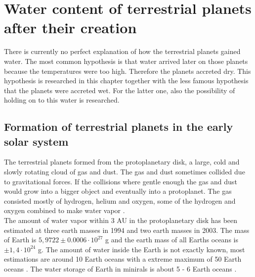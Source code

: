\section{\label{chap:creation}Water content of terrestrial planets after their creation}
There is currently no perfect explanation of how the terrestrial planets gained water. The most common hypothesis is that water arrived later on those planets because the temperatures were too high. Therefore the planets accreted dry. This hypothesis is researched in this chapter together with the less famous hypothesis that the planets were accreted wet. For the latter one, also the possibility of holding on to this water is researched.


\subsection{Formation of terrestrial planets in the early solar system}
The terrestrial planets formed from the protoplanetary disk, a large, cold and slowly rotating cloud of gas and dust. The gas and dust sometimes collided due to gravitational forces. If the collisions where gentle enough the gas and dust would grow into a bigger object and eventually into a protoplanet. The gas consisted mostly of hydrogen, helium and oxygen, some of the hydrogen and oxygen combined to make water vapor \cite[p.~523]{TPoriginWater}.\\

The amount of water vapor within 3 AU in the protoplanetary disk has been estimated at three earth masses \cite{TPLecluse} in 1994 and two earth masses \cite{TPPalme} \cite{TPLodders} in 2003. The mass of Earth is $5,9722 \pm 0.0006 \cdot 10^{27}$ g and the earth mass of all Earths oceans is $\pm 1,4 \cdot 10^{24}$ g. The amount of water inside the Earth is not exactly known, most estimations are around 10 Earth oceans with a extreme maximum of 50 Earth oceans \cite[p.~523]{TPoriginWater}. The water storage of Earth in minirals is about 5 - 6 Earth oceans \cite{TPOhtani}.\\

